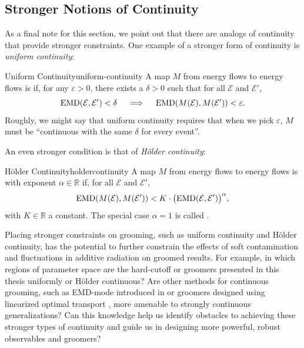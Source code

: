 \subsection{Stronger Notions of Continuity}
\label{sec:stronger-continuity}

As a final note for this section, we point out that there are analogs of continuity that provide stronger constraints.
%
One example of a stronger form of continuity is \textit{uniform continuity}:
\begin{definitionbox}{Uniform Continuity}{uniform-continuity}
    A map \(M\) from energy flows to energy flows is  if, for any \(\varepsilon > 0\), there exists a \(\delta > 0\) such that for all \(\mathcal{E}\) and \(\mathcal E'\),
    \begin{equation*}
        \label{eq:emduniformcontinuity}
        {\rm EMD}(\mathcal E,\mathcal E') < \delta
        \quad\implies\quad
        {\rm EMD}(M(\mathcal E), M(\mathcal E')) < \varepsilon.
    \end{equation*}
    Roughly, we might say that uniform continuity requires that when we pick \(\varepsilon\), \(M\) must be ``continuous with the same \(\delta\) for every event''.
\end{definitionbox}

\noindent
An even stronger condition is that of \textit{H\"older continuity}:

\begin{definitionbox}{H\"older Continuity}{holdercontinuity}
    A map \(M\) from energy flows to energy flows is  with exponent \(\alpha \in \mathbb R\) if, for all \(\mathcal{E}\) and \(\mathcal E'\),
    \begin{equation*}\label{eq:emdholdercontinuity}
        {\rm EMD}(M(\mathcal E), M(\mathcal E'))
        <
        K \cdot \big({\rm EMD}(\mathcal E, \mathcal E')\big)^\alpha,
    \end{equation*}
    with \(K\in \mathbb R\) a constant.
    The special case \(\alpha = 1\) is called .
\end{definitionbox}

Placing stronger constraints on grooming, such as uniform continuity and H\"older continuity, has the potential to further constrain the effects of soft contamination and fluctuations in additive radiation on groomed results.
%
For example, in which regions of parameter space are the hard-cutoff or \PIRANHA{} groomers presented in this thesis uniformly or H\"older continuous?
%
Are other methods for continuous grooming, such as EMD-mode \PIRANHA{} introduced in  or \PIRANHA{} groomers designed using linearized optimal transport \cite{Cai:2020vzx,Cai:2021hnn,cai2022linearized,sarrazin2023linearized}, more amenable to strongly continuous generalizations?
%
Can this knowledge help us identify obstacles to achieving these stronger types of continuity and guide us in designing more powerful, robust observables and groomers?

